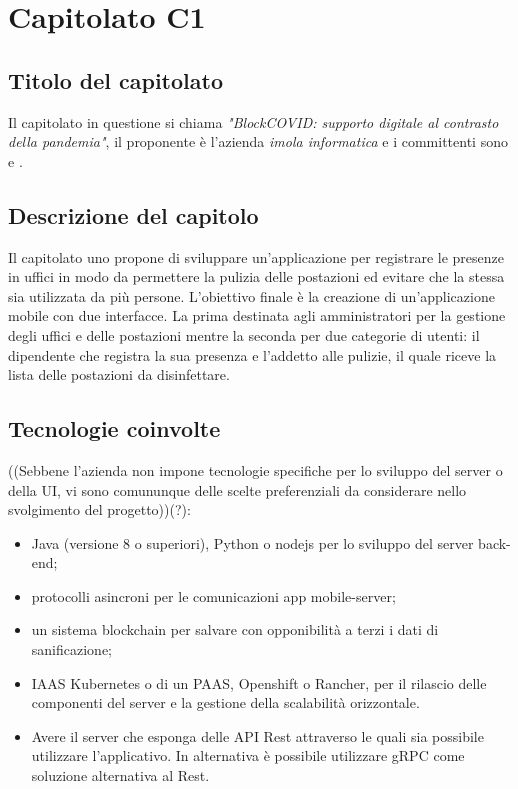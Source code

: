 \section{Capitolato C1}
\subsection{Titolo del capitolato}
Il capitolato in questione si chiama \textit{"BlockCOVID: supporto digitale al contrasto della pandemia"}, il proponente \`e l'azienda \textit{imola informatica} e i committenti sono \VT{} e \CR{}.

\subsection{Descrizione del capitolo}
Il capitolato uno propone di sviluppare un'applicazione per registrare le presenze in uffici in modo da permettere la pulizia delle postazioni ed evitare che la stessa sia utilizzata da più persone.
L'obiettivo finale è la creazione di un'applicazione mobile con due interfacce. La prima destinata agli amministratori per la gestione degli uffici e delle postazioni mentre la seconda per due categorie di utenti: il dipendente che registra la sua presenza e l'addetto alle pulizie, il quale riceve la lista delle postazioni da disinfettare.

\subsection{Tecnologie coinvolte}
((Sebbene l'azienda non impone tecnologie specifiche per lo sviluppo del server o della UI, vi sono comununque delle scelte preferenziali da considerare nello svolgimento del progetto))(?):
\begin{itemize}
\item	Java (versione 8 o superiori), Python o nodejs per lo sviluppo del server back-end;
\item	protocolli asincroni per le comunicazioni app mobile-server;
\item	un sistema blockchain per salvare con opponibilità a terzi i dati di sanificazione;
\item	IAAS Kubernetes o di un PAAS, Openshift o Rancher, per il rilascio delle componenti del server e la gestione della scalabilità orizzontale.
\item	Avere il server che esponga delle API Rest attraverso le quali sia possibile utilizzare l'applicativo. In alternativa è possibile utilizzare gRPC come soluzione alternativa al Rest.
\end{itemize}

